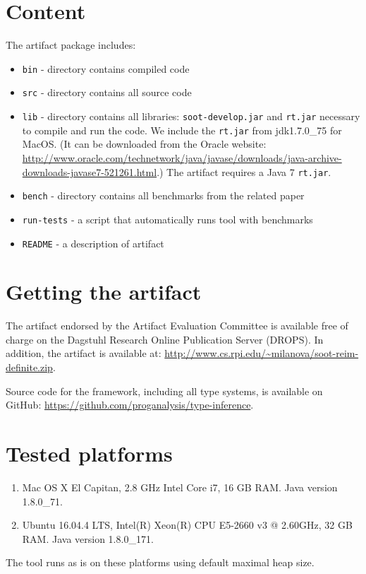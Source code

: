 \documentclass[a4paper,UKenglish]{darts-v2018}
\newenvironment{content}{\section{Content}}{}
\newenvironment{getting}{\section{Getting the artifact} The artifact 
endorsed by the Artifact Evaluation Committee is available free of 
charge on the Dagstuhl Research Online Publication Server (DROPS).}{}
\newenvironment{platforms}{\section{Tested platforms}}{}
\begin{document}
\begin{content}
The artifact package includes:

\begin{itemize}
\item \texttt{bin} - directory contains compiled code
\item \texttt{src} - directory contains all source code
\item \texttt{lib} - directory contains all libraries: \texttt{soot-develop.jar} and \texttt{rt.jar} necessary to compile 
and run the code. 
We include the \texttt{rt.jar} from jdk1.7.0\_75 for MacOS. (It can be downloaded from the Oracle
website: \url{http://www.oracle.com/technetwork/java/javase/downloads/java-archive-downloads-javase7-521261.html}.) 
The artifact requires a Java 7 \texttt{rt.jar}. 

\item \texttt{bench} - directory contains all benchmarks from the related paper

\item \texttt{run-tests} - a script that automatically runs tool with benchmarks

\item \texttt{README} - a description of artifact

\end{itemize}
\end{content}

\begin{getting}
In addition, the artifact is available at:
\url{http://www.cs.rpi.edu/~milanova/soot-reim-definite.zip}.

Source code for the framework, including all type systems, is available on 
GitHub: \url{https://github.com/proganalysis/type-inference}.
\end{getting}

\begin{platforms}


\begin{enumerate}
\item Mac OS X El Capitan, 2.8 GHz Intel Core i7, 16 GB RAM. Java version 1.8.0\_71.
\item Ubuntu 16.04.4 LTS, Intel(R) Xeon(R) CPU E5-2660 v3 @ 2.60GHz, 32 GB RAM. Java version 1.8.0\_171.
\end{enumerate}

The tool runs as is on these platforms using default maximal heap size.

\end{platforms}
\end{document}
